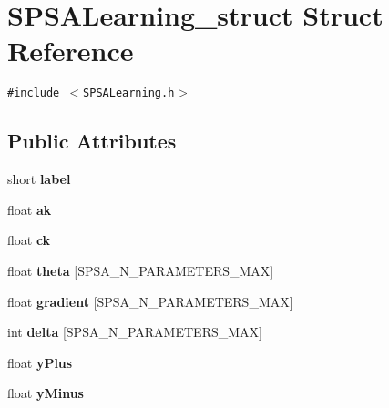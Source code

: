 \hypertarget{structSPSALearning__struct}{
\section{SPSALearning\_\-struct Struct Reference}
\label{structSPSALearning__struct}
}
{\tt \#include $<$SPSALearning.h$>$}

\subsection*{Public Attributes}
\begin{CompactItemize}
\item 
\hypertarget{structSPSALearning__struct_39d942ff6129023e690f1dd7b7d1a663}{
short \textbf{label}}
\label{structSPSALearning__struct_39d942ff6129023e690f1dd7b7d1a663}

\item 
\hypertarget{structSPSALearning__struct_2044a5e383345dc6aa77b08b3f31c8ba}{
float \textbf{ak}}
\label{structSPSALearning__struct_2044a5e383345dc6aa77b08b3f31c8ba}

\item 
\hypertarget{structSPSALearning__struct_2ec9a17799dd72b8199c1cf154c0f385}{
float \textbf{ck}}
\label{structSPSALearning__struct_2ec9a17799dd72b8199c1cf154c0f385}

\item 
\hypertarget{structSPSALearning__struct_485d41fb4636b9ef5488502b6e4d14ae}{
float \textbf{theta} \mbox{[}SPSA\_\-N\_\-PARAMETERS\_\-MAX\mbox{]}}
\label{structSPSALearning__struct_485d41fb4636b9ef5488502b6e4d14ae}

\item 
\hypertarget{structSPSALearning__struct_19826412119cbef16026824cbc51920c}{
float \textbf{gradient} \mbox{[}SPSA\_\-N\_\-PARAMETERS\_\-MAX\mbox{]}}
\label{structSPSALearning__struct_19826412119cbef16026824cbc51920c}

\item 
\hypertarget{structSPSALearning__struct_878f16c8a1d467662893ccc769b27d7c}{
int \textbf{delta} \mbox{[}SPSA\_\-N\_\-PARAMETERS\_\-MAX\mbox{]}}
\label{structSPSALearning__struct_878f16c8a1d467662893ccc769b27d7c}

\item 
\hypertarget{structSPSALearning__struct_7cd73a78643d18e91f1253e2b5118da0}{
float \textbf{yPlus}}
\label{structSPSALearning__struct_7cd73a78643d18e91f1253e2b5118da0}

\item 
\hypertarget{structSPSALearning__struct_e1f0c0be7843a8e60a0c15c64ef9d38b}{
float \textbf{yMinus}}
\label{structSPSALearning__struct_e1f0c0be7843a8e60a0c15c64ef9d38b}


\end{CompactItemize}
